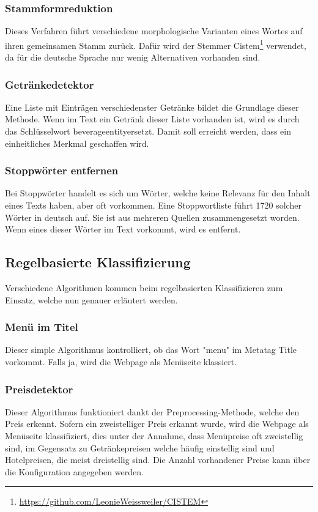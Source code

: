 \subsubsection{Stammformreduktion}
Dieses Verfahren führt verschiedene morphologische Varianten eines Wortes auf ihren gemeinsamen Stamm zurück.
Dafür wird der Stemmer \glqq Cistem\footnote{\url{https://github.com/LeonieWeissweiler/CISTEM}} \grqq verwendet, da für die deutsche Sprache nur wenig Alternativen vorhanden sind. 
\subsubsection{Getränkedetektor}
Eine Liste mit Einträgen verschiedenster Getränke bildet die Grundlage dieser Methode.
Wenn im Text ein Getränk dieser Liste vorhanden ist, wird es durch das Schlüsselwort \glqq beverageentity\grqq ersetzt.
Damit soll erreicht werden, dass ein einheitliches Merkmal geschaffen wird.
\subsubsection{Stoppwörter entfernen}
Bei Stoppwörter handelt es sich um Wörter, welche keine Relevanz für den Inhalt eines Texts haben, aber oft vorkommen.
Eine Stoppwortliste führt 1720 solcher Wörter in deutsch auf. Sie ist aus mehreren Quellen zusammengesetzt worden.
Wenn eines dieser Wörter im Text vorkommt, wird es entfernt.
\subsection{Regelbasierte Klassifizierung}
Verschiedene Algorithmen kommen beim regelbasierten Klassifizieren zum Einsatz, welche nun genauer erläutert werden.
\subsubsection{Menü im Titel}
Dieser simple Algorithmus kontrolliert, ob das Wort "menu" im Metatag \glqq Title \grqq vorkommt.
Falls ja, wird die Webpage als Menüseite klassiert.
\subsubsection{Preisdetektor}
Dieser Algorithmus funktioniert dankt der Preprocessing-Methode, welche den Preis erkennt.
Sofern ein zweistelliger Preis erkannt wurde, wird die Webpage als Menüseite klassifiziert, dies unter der Annahme, dass Menüpreise oft zweistellig sind, im Gegensatz zu Getränkepreisen welche häufig einstellig sind und Hotelpreisen, die meist dreistellig sind.
Die Anzahl vorhandener Preise kann über die Konfiguration angegeben werden.
